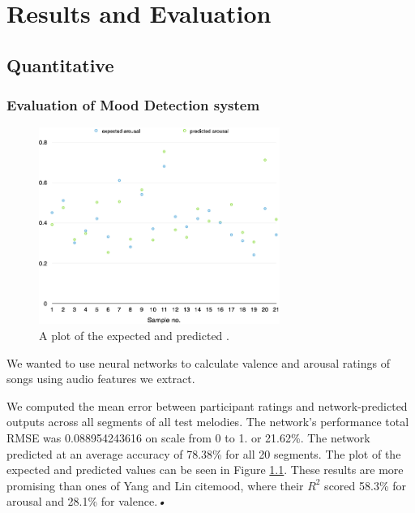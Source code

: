 
\chapter{Results and Evaluation} %

\label{Chapter6} %




\section{Quantitative}
\vspace{10pt}

\subsection{Evaluation of Mood Detection system}

\begin{figure}[t]
    \includegraphics[width=0.7\textwidth]{Figures/finalarousal}
    \centering

  \caption{A plot of the expected and predicted .}
  \label{fig:anneval}
\end{figure}


We wanted to use neural networks to calculate valence and arousal ratings of songs using audio features we extract. 

We computed the mean error between participant ratings and network-predicted outputs across all segments of all test melodies. The network's performance total RMSE was 0.088954243616 on scale from 0 to 1. or 21.62\%.
The network predicted at an average accuracy of 78.38\% for all 20 segments. The plot of the expected and predicted values can be seen in Figure \ref{fig:anneval}.
These results are more promising than ones of Yang and Lin cite{mood}, where their $R^2$ scored 58.3\% for arousal and 28.1\% for valence.\textit{•}


